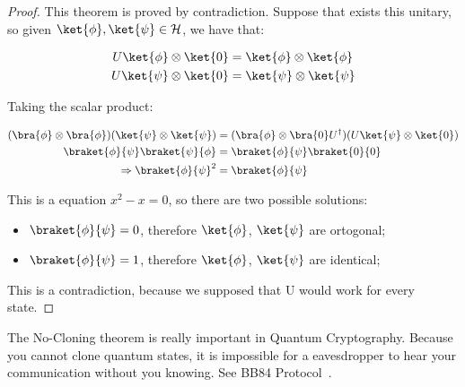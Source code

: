 \begin{proof}
This theorem is proved by contradiction. Suppose that exists this unitary, so given $\ket{\phi}, \ket{\psi} \in \mathcal{H}$, we have that:

\begin{equation}
\begin{split}
    U \ket{\phi} \otimes \ket{0} & = \ket{\phi} \otimes \ket{\phi} \\ 
    U \ket{\psi} \otimes \ket{0} & = \ket{\psi} \otimes \ket{\psi}
\end{split}
\end{equation}

Taking the scalar product: 

\begin{equation}
    \begin{split}
        (\bra{\phi} \otimes \bra{\phi}) (\ket{\psi} \otimes \ket{\psi}) & =( \bra{\phi} \otimes \bra{0} U^\dagger)  (U \ket{\psi} \otimes \ket{0}) \\
        \braket{\phi}{\psi}\braket{\psi}{\phi} & = \braket{\phi}{\psi} \braket{0}{0}\\
        \Rightarrow \braket{\phi}{\psi}^2 & = \braket{\phi}{\psi}
    \end{split}
\end{equation}

This is a equation $x^2 - x = 0$, so there are two possible solutions: 

\begin{itemize}
    \item  $\braket{\phi}{\psi} = 0$, therefore $\ket{\phi}$, $\ket{\psi}$ are ortogonal;
    \item $\braket{\phi}{\psi} = 1$, therefore $\ket{\phi}$, $\ket{\psi}$ are identical;
\end{itemize}

This is a contradiction, because we supposed that U would work for every state.

\end{proof}

The No-Cloning theorem is really important in Quantum Cryptography. Because you cannot clone quantum states, it is impossible for a eavesdropper to hear your communication without you knowing. See BB84 Protocol~\citep{BB84}.

